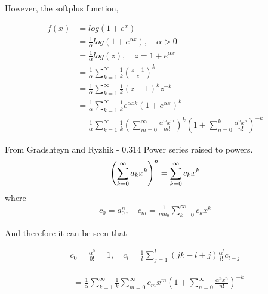 However, the softplus function,

\begin{align*}
	f(x) & = log(1+e^x)\\
	& = \frac{1}{\alpha}log(1+e^{\alpha x}), \quad \alpha > 0 \\
	& = \frac{1}{\alpha}log(z), \quad z = 1 + e^{\alpha x} \\
	& = \frac{1}{\alpha}\sum\limits_{k=1}^\infty
	\frac{1}{k}\left(\frac{z-1}{z}\right)^k \\
	& = \frac{1}{\alpha}\sum\limits_{k=1}^\infty
	\frac{1}{k}(z-1)^{k} z^{-k} \\
	& = \frac{1}{\alpha}\sum\limits_{k=1}^\infty
	\frac{1}{k} e^{\alpha x k} (1 + e^{\alpha x})^{k} \\
	& = \frac{1}{\alpha}\sum\limits_{k=1}^\infty
	\frac{1}{k} \left(\sum\limits_{m=0}^\infty
	\frac{\alpha^{m} x^{m}}{m!}\right)^k \left(1 + \sum\limits_{n=0}^{k} \frac{\alpha^{n} x^{n}}{n!}\right)^{-k}
\end{align*}

From Gradshteyn and Ryzhik - 0.314 Power series raised to powers.
\begin{equation}
	\left(\sum\limits_{k=0}^{\infty}a_{k}x^{k}\right)^{n} = \sum\limits_{k=0}^{\infty}c_{k}x^{k} \\
	\label{eqn:power series raised to powers}
\end{equation}
where
\begin{align*}
	c_{0} = a_{0}^{n}, \quad c_{m} = \frac{1}{ma_{0}}\sum\limits_{k=0}^{\infty}c_{k}x^{k}
\end{align*}

And therefore it can be seen that

\begin{align*}
	c_{0} = \frac{\alpha^{0}}{0!}=1, \quad c_{l} = \frac{1}{l}\sum\limits_{j=1}^{l}(jk-l+j)\frac{\alpha^{l}}{l!}c_{l-j}
\end{align*}

\begin{align*}
	& = \frac{1}{\alpha}\sum\limits_{k=1}^{\infty}\frac{1}{k}\sum\limits_{m=0}^{\infty}c_{m}x^{m}\left( 1+\sum\limits_{n=0}^{\infty}\frac{\alpha^{n}x^{n}}{n!}\right)^{-k} \\
\end{align*}

